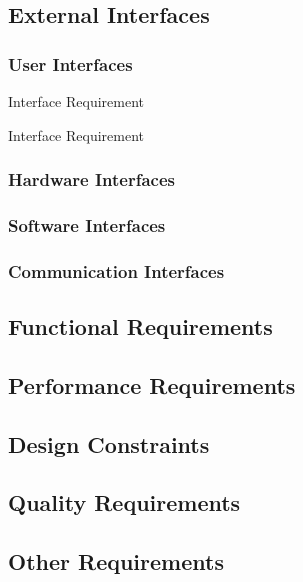 \subsection{External Interfaces}
\label{requirements:interfaces}

	\subsubsection{User Interfaces}
	\label{requirements:interfaces:user}

		\begin{requirement}{Interface Requirement}
		\end{requirement}

		\begin{requirement}{Interface Requirement}
		\end{requirement}

	
	\subsubsection{Hardware Interfaces}
	\label{requirements:interfaces:hardware}
	
	\subsubsection{Software Interfaces}
	\label{requirements:interfaces:software}

	\subsubsection{Communication Interfaces}
	\label{requirements:interfaces:communication}
	

\subsection{Functional Requirements}
\label{requirements:functional}


\subsection{Performance Requirements}
\label{requirements:performance}


\subsection{Design Constraints}
\label{requirements:constraints}


\subsection{Quality Requirements}
\label{requirements:quality}


\subsection{Other Requirements}
\label{requirements:other}
